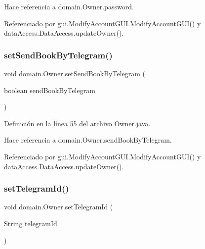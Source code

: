 Hace referencia a domain.\+Owner.\+password.



Referenciado por gui.\+Modify\+Account\+G\+U\+I.\+Modify\+Account\+G\+U\+I() y data\+Access.\+Data\+Access.\+update\+Owner().

\mbox{\label{classdomain_1_1_owner_a4541457ba4d275025e6134f9402a6c5e}} 
\subsubsection{\texorpdfstring{setSendBookByTelegram()}{setSendBookByTelegram()}}
{\footnotesize\ttfamily void domain.\+Owner.\+set\+Send\+Book\+By\+Telegram (\begin{DoxyParamCaption}\item[{boolean}]{send\+Book\+By\+Telegram }\end{DoxyParamCaption})}



Definición en la línea 55 del archivo Owner.\+java.


\begin{DoxyCode}{0}

\end{DoxyCode}


Hace referencia a domain.\+Owner.\+send\+Book\+By\+Telegram.



Referenciado por gui.\+Modify\+Account\+G\+U\+I.\+Modify\+Account\+G\+U\+I() y data\+Access.\+Data\+Access.\+update\+Owner().

\mbox{\label{classdomain_1_1_owner_ac024ef11aaf4d4875f421c75365e3c9e}} 
\subsubsection{\texorpdfstring{setTelegramId()}{setTelegramId()}}
{\footnotesize\ttfamily void domain.\+Owner.\+set\+Telegram\+Id (\begin{DoxyParamCaption}\item[{String}]{telegram\+Id }\end{DoxyParamCaption})}



